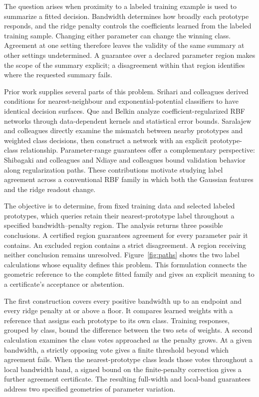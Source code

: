 \documentclass[preprint,12pt,authoryear]{elsarticle}
\begin{document}
The question arises when proximity to a labeled training example is used to summarize a fitted decision. Bandwidth determines how broadly each prototype responds, and the ridge penalty controls the coefficients learned from the labeled training sample. Changing either parameter can change the winning class. Agreement at one setting therefore leaves the validity of the same summary at other settings undetermined. A guarantee over a declared parameter region makes the scope of the summary explicit; a disagreement within that region identifies where the requested summary fails.

Prior work supplies several parts of this problem. Srihari and colleagues \citeyearpar{srihari1979} derived conditions for nearest-neighbour and exponential-potential classifiers to have identical decision surfaces. Que and Belkin \citeyearpar{que2016} analyze coefficient-regularized RBF networks through data-dependent kernels and statistical error bounds. Saralajew and colleagues \citeyearpar{saralajew2025} directly examine the mismatch between nearby prototypes and weighted class decisions, then construct a network with an explicit prototype-class relationship. Parameter-range guarantees offer a complementary perspective: Shibagaki and colleagues \citeyearpar{shibagaki2015} and Ndiaye and colleagues \citeyearpar{ndiaye2019} bound validation behavior along regularization paths. These contributions motivate studying label agreement across a conventional RBF family in which both the Gaussian features and the ridge readout change.

The objective is to determine, from fixed training data and selected labeled prototypes, which queries retain their nearest-prototype label throughout a specified bandwidth--penalty region. The analysis returns three possible conclusions. A certified region guarantees agreement for every parameter pair it contains. An excluded region contains a strict disagreement. A region receiving neither conclusion remains unresolved. Figure~\ref{fig:paths} shows the two label calculations whose equality defines this problem. This formulation connects the geometric reference to the complete fitted family and gives an explicit meaning to a certificate's acceptance or abstention.

The first construction covers every positive bandwidth up to an endpoint and every ridge penalty at or above a floor. It compares learned weights with a reference that assigns each prototype to its own class. Training responses, grouped by class, bound the difference between the two sets of weights. A second calculation examines the class votes approached as the penalty grows. At a given bandwidth, a strictly opposing vote gives a finite threshold beyond which agreement fails. When the nearest-prototype class leads those votes throughout a local bandwidth band, a signed bound on the finite-penalty correction gives a further agreement certificate. The resulting full-width and local-band guarantees address two specified geometries of parameter variation.
\end{document}
